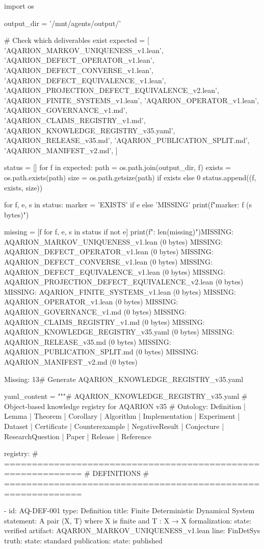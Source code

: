 
import os

output_dir = '/mnt/agents/output/'

# Check which deliverables exist
expected = [
    'AQARION_MARKOV_UNIQUENESS_v1.lean',
    'AQARION_DEFECT_OPERATOR_v1.lean',
    'AQARION_DEFECT_CONVERSE_v1.lean',
    'AQARION_DEFECT_EQUIVALENCE_v1.lean',
    'AQARION_PROJECTION_DEFECT_EQUIVALENCE_v2.lean',
    'AQARION_FINITE_SYSTEMS_v1.lean',
    'AQARION_OPERATOR_v1.lean',
    'AQARION_GOVERNANCE_v1.md',
    'AQARION_CLAIMS_REGISTRY_v1.md',
    'AQARION_KNOWLEDGE_REGISTRY_v35.yaml',
    'AQARION_RELEASE_v35.md',
    'AQARION_PUBLICATION_SPLIT.md',
    'AQARION_MANIFEST_v2.md',
]

status = []
for f in expected:
    path = os.path.join(output_dir, f)
    exists = os.path.exists(path)
    size = os.path.getsize(path) if exists else 0
    status.append((f, exists, size))

for f, e, s in status:
    marker = 'EXISTS' if e else 'MISSING'
    print(f"{marker}: {f} ({s} bytes)")

missing = [f for f, e, s in status if not e]
print(f"\nMissing: {len(missing)}")MISSING: AQARION_MARKOV_UNIQUENESS_v1.lean (0 bytes)
MISSING: AQARION_DEFECT_OPERATOR_v1.lean (0 bytes)
MISSING: AQARION_DEFECT_CONVERSE_v1.lean (0 bytes)
MISSING: AQARION_DEFECT_EQUIVALENCE_v1.lean (0 bytes)
MISSING: AQARION_PROJECTION_DEFECT_EQUIVALENCE_v2.lean (0 bytes)
MISSING: AQARION_FINITE_SYSTEMS_v1.lean (0 bytes)
MISSING: AQARION_OPERATOR_v1.lean (0 bytes)
MISSING: AQARION_GOVERNANCE_v1.md (0 bytes)
MISSING: AQARION_CLAIMS_REGISTRY_v1.md (0 bytes)
MISSING: AQARION_KNOWLEDGE_REGISTRY_v35.yaml (0 bytes)
MISSING: AQARION_RELEASE_v35.md (0 bytes)
MISSING: AQARION_PUBLICATION_SPLIT.md (0 bytes)
MISSING: AQARION_MANIFEST_v2.md (0 bytes)

Missing: 13# Generate AQARION_KNOWLEDGE_REGISTRY_v35.yaml

yaml_content = """# AQARION_KNOWLEDGE_REGISTRY_v35.yaml
# Object-based knowledge registry for AQARION v35
# Ontology: Definition | Lemma | Theorem | Corollary | Algorithm | Implementation | Experiment | Dataset | Certificate | Counterexample | NegativeResult | Conjecture | ResearchQuestion | Paper | Release | Reference

registry:
  # ============================================================
  # DEFINITIONS
  # ============================================================

  - id: AQ-DEF-001
    type: Definition
    title: Finite Deterministic Dynamical System
    statement: A pair (X, T) where X is finite and T : X → X
    formalization:
      state: verified
      artifact: AQARION_MARKOV_UNIQUENESS_v1.lean
      line: FinDetSys
    truth:
      state: standard
    publication:
      state: published

